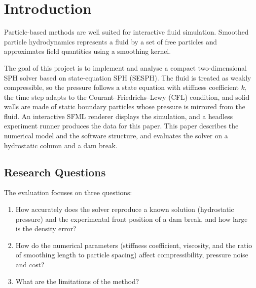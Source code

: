 \section{Introduction}

Particle-based methods are well suited for interactive fluid simulation. 
Smoothed particle hydrodynamics represents a fluid by a
set of free particles and approximates field quantities using a smoothing
kernel.

The goal of this project is to implement and analyse a compact two-dimensional
SPH solver based on state-equation SPH (SESPH). The fluid is treated as weakly compressible, so the
 pressure follows a state equation with
stiffness coefficient $k$, the time step adapts to the Courant–Friedrichs–Lewy (CFL) condition, and solid
walls are made of static boundary particles whose pressure is mirrored from the
fluid. An interactive SFML renderer displays the simulation, and a
headless experiment runner produces the data for this paper. This paper
describes the numerical model and the software structure, and evaluates the
solver on a hydrostatic column and a dam break.

\subsection{Research Questions}

The evaluation focuses on three questions:
\begin{enumerate}
    \item How accurately does the solver reproduce a known solution
    (hydrostatic pressure) and the experimental front position of a dam break, and how large is the density error?
    \item How do the numerical parameters (stiffness coefficient, viscosity,
    and the ratio of smoothing length to particle spacing) affect compressibility,
    pressure noise and cost?
    \item What are the limitations of the method?
\end{enumerate}
\newpage
